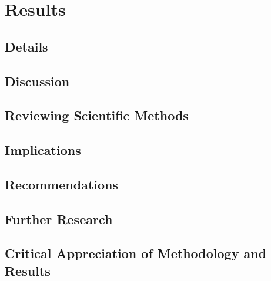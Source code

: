 
\chapter{Results}

\section{Details}

\section{Discussion}

\section{Reviewing Scientific Methods}

\section{Implications}

\section{Recommendations}

\section{Further Research}

\section{Critical Appreciation of Methodology and Results}
